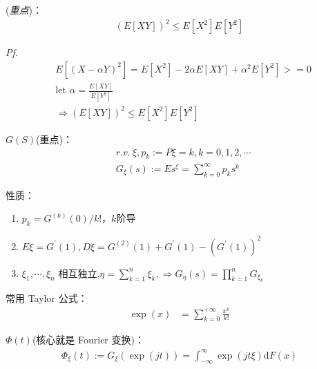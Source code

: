 
(\emph{重点})：
\begin{align*}
	(E[XY])^2 \le E[X^2]E[Y^2]
\end{align*}

\emph*{Pf.}
\begin{align*}
	&E[(X-\alpha Y)^2] = E[X^2] - 2\alpha E[XY] + \alpha^2E[Y^2]>= 0 \\
	&\text{let } \alpha = \frac{E[XY]}{E[Y^2]} \\
	&\Rightarrow (E[XY])^2 \le E[X^2]E[Y^2]
\end{align*}


$G(S)$(重点)：
\begin{align*}
	&r.v.\ \xi, p_k := P{\xi = k}, k=0,1,2,\cdots\\
	&G_\xi(s) := Es^\xi = \sum_{k=0}^\infty p_k s^k
\end{align*}

性质：
\begin{enumerate}
	\item $p_k = G^{(k)}(0)/k!$，$k$阶导
	\item $E\xi = G^\prime(1), D\xi = G^{(2)}(1) + G^\prime(1) - (G^\prime(1))^2$
	\item $\xi_1, \cdots, \xi_n$ 相互独立,$\eta = \sum_{k=1}^n \xi_k, \Rightarrow G_\eta(s) = \prod_{k=1}^n G_{\xi_k}$
\end{enumerate}

常用 Taylor 公式：
\begin{align*}
	\exp(x) &= \sum_{k=0}^{+\infty} \frac{x^k}{k!}
\end{align*}


$\Phi(t)$(核心就是 Fourier 变换)：
\begin{align*}
	\Phi_\xi(t) := G_\xi(\exp(\mathit{j}t)) = \int_{-\infty}^\infty \exp(jt\xi) \mathrm{d}F(x)
\end{align*}

